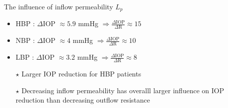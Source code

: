 \begin{frame}{The influence of inflow permeability $L_p$}
\begin{itemize}
\item \alert{HBP }: $\Delta$IOP $\approx 5.9$ mmHg
$\Rightarrow\frac{\Delta \mathrm{IOP}}{\Delta \mathrm{R}} \approx 15$
\medskip

\item \alert{NBP }: $\Delta$IOP $\approx 4$ mmHg
$\Rightarrow
\frac{\Delta \mathrm{IOP}}{\Delta \mathrm{R}} \approx 10$
\medskip
\item \alert{LBP }: $\Delta$IOP $\approx 3.2$ mmHg
$\Rightarrow
\frac{\Delta \mathrm{IOP}}{\Delta \mathrm{R}} \approx 8$
\end{itemize}
\bigskip
\begin{itemize}
\item[$\star$] Larger IOP reduction for HBP patients
\medskip
\item[$\star$] Decreasing inflow permeability has overalll larger influence on IOP reduction than decreasing outflow resistance
\end{itemize}
\end{frame}

%
